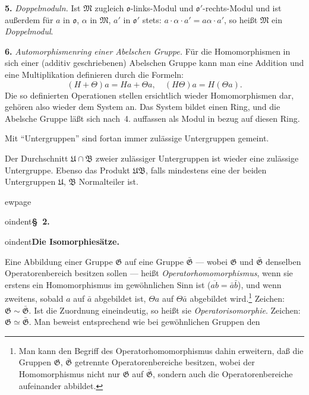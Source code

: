 \documentclass[12pt,a4paper]{article}
\theoremstyle{definition}
\begin{document}
\textbf{5.} \textit{Doppelmoduln.} Ist $\mathfrak{M}$ zugleich
$\mathfrak{o}$-links-Modul und $\mathfrak{o}'$-rechts-Modul und ist
au\ss erdem f\"ur $a$ in $\mathfrak{o}$, $\alpha$ in $\mathfrak{M}$, $a'$
in $\mathfrak{o}'$ stets: $a \cdot \alpha \cdot a' = a\alpha \cdot a'$,
so hei\ss t $\mathfrak{M}$ ein \textit{Doppelmodul}.

\textbf{6.} \textit{Automorphismenring einer Abelschen Gruppe.} F\"ur die
Homomorphismen in sich einer (additiv geschriebenen) Abelschen Gruppe
kann man eine Addition und eine Multiplikation definieren durch die
Formeln:
\[
(H + \Theta)a = Ha + \Theta a, \quad (H\Theta)a = H(\Theta a).
\]
Die so definierten Operationen stellen ersichtlich wieder
Homomorphismen dar, geh\"oren also wieder dem System an. Das System
bildet einen Ring, und die Abelsche Gruppe l\"a\ss t sich nach~4.
auffassen als Modul in bezug auf diesen Ring.

Mit ``Untergruppen'' sind fortan immer zul\"assige Untergruppen gemeint.

Der Durchschnitt $\mathfrak{U} \cap \mathfrak{B}$ zweier zul\"assiger
Untergruppen ist wieder eine zul\"assige Untergruppe. Ebenso das
Produkt $\mathfrak{U}\mathfrak{B}$, falls mindestens eine der beiden
Untergruppen $\mathfrak{U}$, $\mathfrak{B}$ Normalteiler ist.



ewpage
\setcounter{page}{583}



oindent\textbf{\S~2.}



oindent\textbf{Die Isomorphies\"atze.}

Eine Abbildung einer Gruppe $\mathfrak{G}$ auf eine Gruppe
$\bar{\mathfrak{G}}$ --- wobei $\mathfrak{G}$ und $\bar{\mathfrak{G}}$
denselben Operatorenbereich besitzen sollen --- hei\ss t
\textit{Operatorhomomorphismus}, wenn sie erstens ein Homomorphismus im
gew\"ohnlichen Sinn ist ($\overline{ab} = \bar{a}\bar{b}$), und wenn
zweitens, sobald $a$ auf $\bar{a}$ abgebildet ist, $\Theta a$ auf
$\Theta\bar{a}$ abgebildet wird.\footnote{Man kann den Begriff des
Operatorhomomorphismus dahin erweitern, da\ss{} die Gruppen
$\mathfrak{G}$, $\bar{\mathfrak{G}}$ getrennte Operatorenbereiche besitzen,
wobei der Homomorphismus nicht nur $\mathfrak{G}$ auf
$\bar{\mathfrak{G}}$, sondern auch die Operatorenbereiche aufeinander
abbildet.} Zeichen: $\mathfrak{G} \sim \bar{\mathfrak{G}}$. Ist die
Zuordnung eineindeutig, so hei\ss t sie \textit{Operatorisomorphie}.
Zeichen: $\mathfrak{G} \simeq \bar{\mathfrak{G}}$. Man beweist
entsprechend wie bei gew\"ohnlichen Gruppen den
\end{document}
